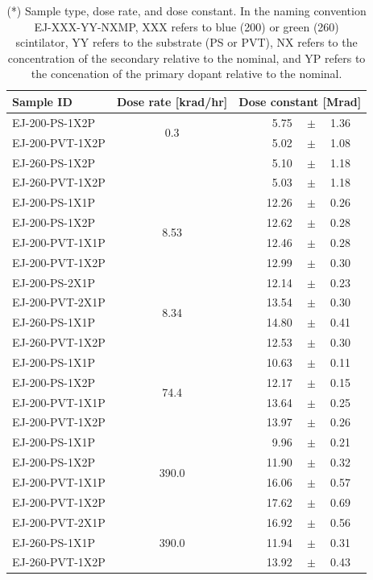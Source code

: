 \documentclass[review]{elsarticle}
\begin{document}
\begin{table}[hbtp]
  \centering
  \begin{tabular}{l c l@{\hspace{1.8em}}r@{ }c@{ }l}
    \hline\hline
    Sample ID & Dose rate [krad/hr] & \multicolumn{4}{c}{Dose constant [Mrad]} \\
    \hline
    EJ-200-PS-1X2P   & \multirow{2}{*}{0.3} & & 5.75 & $\pm$ & 1.36 \\
    EJ-200-PVT-1X2P & & & 5.02 & $\pm$ & 1.08 \\
    EJ-260-PS-1X2P    & & & 5.10 & $\pm$ & 1.18 \\
    EJ-260-PVT-1X2P  & & & 5.03 & $\pm$ & 1.18 \\
    \hline
    EJ-200-PS-1X1P   & \multirow{4}{*}{8.53} & & 12.26 & $\pm$ & 0.26 \\
    EJ-200-PS-1X2P   & & & 12.62 & $\pm$ & 0.28 \\
    EJ-200-PVT-1X1P & & & 12.46 & $\pm$ & 0.28 \\
    EJ-200-PVT-1X2P & & & 12.99 & $\pm$ & 0.30 \\
    \hline
    EJ-200-PS-2X1P   & \multirow{4}{*}{8.34} & & 12.14 & $\pm$ & 0.23 \\
    EJ-200-PVT-2X1P & & & 13.54 & $\pm$ & 0.30 \\
    EJ-260-PS-1X1P   & & & 14.80 & $\pm$ & 0.41 \\
    EJ-260-PVT-1X2P & & & 12.53 & $\pm$ & 0.30 \\
    \hline
    EJ-200-PS-1X1P   & \multirow{4}{*}{74.4} & & 10.63 & $\pm$ & 0.11 \\
    EJ-200-PS-1X2P   & & & 12.17 & $\pm$ & 0.15 \\
    EJ-200-PVT-1X1P & & & 13.64 & $\pm$ & 0.25 \\
    EJ-200-PVT-1X2P & & & 13.97 & $\pm$ & 0.26 \\
    \hline
    EJ-200-PS-1X1P   & \multirow{4}{*}{390.0} & & 9.96 & $\pm$ & 0.21 \\
    EJ-200-PS-1X2P   & & & 11.90 & $\pm$ & 0.32 \\
    EJ-200-PVT-1X1P & & & 16.06 & $\pm$ & 0.57 \\
    EJ-200-PVT-1X2P & & & 17.62 & $\pm$ & 0.69 \\
    \hline
    EJ-200-PVT-2X1P & \multirow{3}{*}{390.0} & & 16.92 & $\pm$ & 0.56 \\
    EJ-260-PS-1X1P   & & & 11.94 & $\pm$ & 0.31 \\
    EJ-260-PVT-1X2P & & & 13.92 & $\pm$ & 0.43 \\
    \hline
  \end{tabular}
  \caption{(*) Sample type, dose rate, and dose constant.  
In the naming convention EJ-XXX-YY-NXMP, XXX refers to blue (200) or green (260) scintilator, YY refers to the substrate (PS or PVT), NX refers to the 
concentration of the
secondary relative to the nominal,
and YP refers to the concenation of the primary dopant relative to the nominal.
}
  \label{tab:results}
\end{table}
\end{document}

